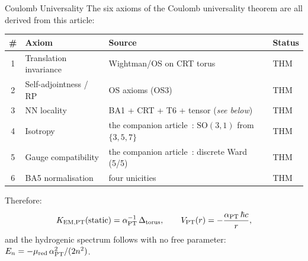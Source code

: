 \documentclass[12pt,a4paper]{article}
\begin{document}
\begin{thmbox}{Coulomb Universality}
\label{thm:coulomb_universality}
The six axioms of the Coulomb universality theorem are all derived
from this article:
\begin{center}
\renewcommand{\arraystretch}{1.1}
\begin{tabular}{clll}
\toprule
\# & Axiom & Source & Status \\
\midrule
1 & Translation invariance & Wightman/OS on CRT torus & THM \\
2 & Self-adjointness / RP & OS axioms (OS3) & THM \\
3 & NN locality & BA1 + CRT + T6 + tensor (\emph{see below}) & THM \\
4 & Isotropy & the companion article~\cite{companion_physics}: $\mathrm{SO}(3,1)$ from $\{3,5,7\}$ & THM \\
5 & Gauge compatibility & the companion article~\cite{companion_physics}: discrete Ward (5/5) & THM \\
6 & BA5 normalisation & four unicities & THM \\
\bottomrule
\end{tabular}
\end{center}
Therefore:
\begin{equation}
  K_{\rm EM,PT}(\text{static})
  = \alpha_{\rm PT}^{-1}\,\Delta_{\rm torus},
  \qquad
  V_{\rm PT}(r) = -\frac{\alpha_{\rm PT}\,\hbar c}{r},
  \label{eq:coulomb_id}
\end{equation}
and the hydrogenic spectrum follows with no free parameter:
$E_n = -\mu_{\rm red}\,\alpha_{\rm PT}^2/(2n^2)$.
\end{thmbox}
\end{document}
